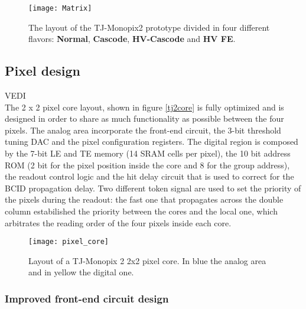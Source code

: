 

\begin{figure}[h!]
\centering
\texttt{[image: Matrix]}
\caption{The layout of the TJ-Monopix2 prototype divided in four different flavors: \textbf{Normal}, \textbf{Cascode}, \textbf{HV-Cascode} and \textbf{HV FE}.}
\label{fig:tj2matrix}
\end{figure}



\subsection{Pixel design}

VEDI\\ 

The 2 x 2 pixel core layout, shown in figure \vref{tj2core} is fully optimized and is designed in order to share as much functionality as possible between the four pixels. The analog area incorporate the front-end circuit, the 3-bit threshold tuning DAC and the pixel configuration registers. The digital region is composed by the 7-bit LE and TE memory (14 SRAM cells per pixel), the 10 bit address ROM (2 bit for the pixel position inside the core and 8 for the group address), the readout control logic and the hit delay circuit that is used to correct for the BCID propagation delay. Two different token signal are used to set the priority of the pixels during the readout: the fast one that propagates across the double column estabilished the priority between the cores and the local one, which arbitrates the reading order of the four pixels inside each core.

\begin{figure}[h!]
\centering
\texttt{[image: pixel\_core]}
\caption{Layout of a TJ-Monopix 2 2x2 pixel core. In blue the analog area and in yellow the digital one.}
\label{fig:tj2core}
\end{figure}



\subsubsection{Improved front-end circuit design}

